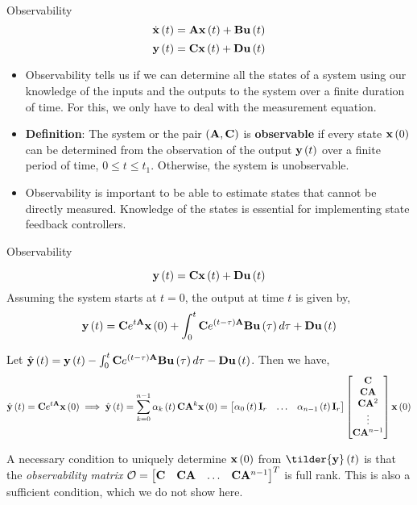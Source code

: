 \documentclass[aspectratio=169]{beamer}
\def\mf{\ensuremath\mathbf}
\def\lp{\ensuremath\left(}
\def\rp{\ensuremath\right)}
\def\bmx{\ensuremath\begin{bmatrix*}[r]}
\def\emx{\ensuremath\end{bmatrix*}}
\def\bmxc{\ensuremath\begin{bmatrix*}[c]}
\newcommand{\ct}[1]{\lp #1\rp}
\begin{document}
\begin{frame}[t]{Observability}
\[ \dot{\mf{x}}\ct{t} = \mf{A}\mf{x}\ct{t} + \mf{B}\mf{u}\ct{t} \]
\[ \mf{y}\ct{t} = \mf{C}\mf{x}\ct{t} + \mf{D}\mf{u}\ct{t} \]
\vspace{-0.5cm}
\begin{itemize}
    \item Observability tells us if we can determine all the states of a system using our knowledge of the inputs and the outputs to the system over a finite duration of time. For this, we only have to deal with the measurement equation.
    
    \item \textbf{Definition}: The system or the pair $\ct{\mf{A}, \mf{C}}$ is \textbf{observable} if every state $\mf{x}\ct{0}$ can be determined from the observation of the output $\mf{y}\ct{t}$ over a finite period of time, $0 \leq t \leq t_1$. Otherwise, the system is unobservable.

    \item Observability is important to be able to estimate states that cannot be directly measured. Knowledge of the states is essential for implementing state feedback controllers.
\end{itemize}
\end{frame}

\begin{frame}{Observability}
\vspace{-0.5cm}
\begin{small}
\[ \mf{y}\ct{t} = \mf{C}\mf{x}\ct{t} + \mf{D}\mf{u}\ct{t} \]
Assuming the system starts at $t=0$, the output at time $t$ is given by,\vspace{-0.15cm}
\[ \mf{y}\ct{t} = \mf{C}e^{t\mf{A}}\mf{x}\ct{0} + \int_{0}^{t} \mf{C}e^{\ct{t - \tau}\mf{A}}\mf{B}\mf{u}\ct{\tau}d\tau + \mf{D}\mf{u}\ct{t} \]

Let $\hat{\mf{y}}\ct{t} = \mf{y}\ct{t} - \int_{0}^{t} \mf{C}e^{\ct{t - \tau}\mf{A}}\mf{B}\mf{u}\ct{\tau}d\tau - \mf{D}\mf{u}\ct{t}$. Then we have,\vspace{-0.25cm}
\[ \hat{\mf{y}}\ct{t} = \mf{C}e^{t\mf{A}}\mf{x}\ct{0} \implies \hat{\mf{y}}\ct{t} = \sum_{k=0}^{n-1} \alpha_k\ct{t}\mf{C}\mf{A}^k\mf{x}\ct{0} =  \bmxc \alpha_0\ct{t}\mf{I}_{r} & \ldots & \alpha_{n-1}\ct{t}\mf{I}_{r} \emx \bmxc \mf{C} \\ \mf{C}\mf{A} \\ \mf{C}\mf{A}^2 \\ \vdots \\ \mf{C}\mf{A}^{n-1} \emx \mf{x}\ct{0}  \]

A necessary condition to uniquely determine $\mf{x}\ct{0}$ from $\tilder{\mf{y}}\ct{t}$ is that the \textit{observability matrix} $\mathcal{O} = \bmx \mf{C} & \mf{C}\mf{A} & \ldots & \mf{C}\mf{A}^{n-1} \emx^T$ is full rank. This is also a sufficient condition, which we do not show here.
\end{small}
\end{frame}
 
\end{document}
